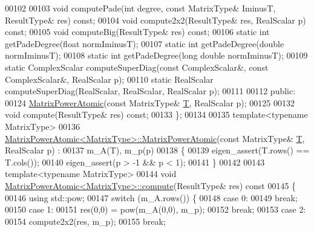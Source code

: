 \begin{DoxyCode}
00102 
00103     \textcolor{keywordtype}{void} computePade(\textcolor{keywordtype}{int} degree, \textcolor{keyword}{const} MatrixType& IminusT, ResultType& res) \textcolor{keyword}{const};
00104     \textcolor{keywordtype}{void} compute2x2(ResultType& res, RealScalar p) \textcolor{keyword}{const};
00105     \textcolor{keywordtype}{void} computeBig(ResultType& res) \textcolor{keyword}{const};
00106     \textcolor{keyword}{static} \textcolor{keywordtype}{int} getPadeDegree(\textcolor{keywordtype}{float} normIminusT);
00107     \textcolor{keyword}{static} \textcolor{keywordtype}{int} getPadeDegree(\textcolor{keywordtype}{double} normIminusT);
00108     \textcolor{keyword}{static} \textcolor{keywordtype}{int} getPadeDegree(\textcolor{keywordtype}{long} \textcolor{keywordtype}{double} normIminusT);
00109     \textcolor{keyword}{static} ComplexScalar computeSuperDiag(\textcolor{keyword}{const} ComplexScalar&, \textcolor{keyword}{const} ComplexScalar&, RealScalar p);
00110     \textcolor{keyword}{static} RealScalar computeSuperDiag(RealScalar, RealScalar, RealScalar p);
00111 
00112   \textcolor{keyword}{public}:
00124     \hyperlink{class_eigen_1_1_matrix_power_atomic}{MatrixPowerAtomic}(\textcolor{keyword}{const} MatrixType& \hyperlink{group___sparse_core___module}{T}, RealScalar p);
00125     
00132     \textcolor{keywordtype}{void} compute(ResultType& res) \textcolor{keyword}{const};
00133 \};
00134 
00135 \textcolor{keyword}{template}<\textcolor{keyword}{typename} MatrixType>
00136 \hyperlink{class_eigen_1_1_matrix_power_atomic_ac0ec5f8d6c203cd9b53e2c95e01037d4}{MatrixPowerAtomic<MatrixType>::MatrixPowerAtomic}(\textcolor{keyword}{const} 
      MatrixType& \hyperlink{group___sparse_core___module}{T}, RealScalar p) :
00137   m\_A(T), m\_p(p)
00138 \{
00139   eigen\_assert(T.rows() == T.cols());
00140   eigen\_assert(p > -1 && p < 1);
00141 \}
00142 
00143 \textcolor{keyword}{template}<\textcolor{keyword}{typename} MatrixType>
00144 \textcolor{keywordtype}{void} \hyperlink{class_eigen_1_1_matrix_power_atomic_ac3cdfb54a5b60079d068784534cbc174}{MatrixPowerAtomic<MatrixType>::compute}(ResultType& res)\textcolor{keyword}{ const}
00145 \textcolor{keyword}{}\{
00146   \textcolor{keyword}{using} std::pow;
00147   \textcolor{keywordflow}{switch} (m\_A.rows()) \{
00148     \textcolor{keywordflow}{case} 0:
00149       \textcolor{keywordflow}{break};
00150     \textcolor{keywordflow}{case} 1:
00151       res(0,0) = pow(m\_A(0,0), m\_p);
00152       \textcolor{keywordflow}{break};
00153     \textcolor{keywordflow}{case} 2:
00154       compute2x2(res, m\_p);
00155       \textcolor{keywordflow}{break};

\end{DoxyCode}
